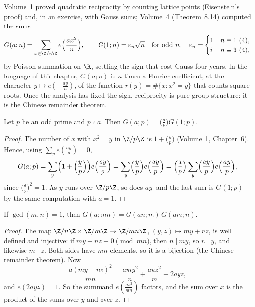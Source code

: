 Volume~1 proved quadratic reciprocity by counting lattice points (Eisenstein's proof) and, in an exercise, with Gauss sums; Volume~4
(Theorem~8.14) computed the sums
\[G(a;n)=\sum_{x\in\Z/n\Z}e\Bigl(\frac{ax^2}n\Bigr),\qquad G(1;n)=\varepsilon_n\sqrt n\quad\text{for odd }n,\quad\varepsilon_n=\begin{cases}1&n\equiv1\ (4),\\i&n\equiv3\ (4),\end{cases}\]
by Poisson summation on $\R$, settling the sign that cost Gauss four years. In the language of this chapter, $G(a;n)$ is $n$ times a
Fourier coefficient, at the character $y\mapsto e(-\frac{ay}n)$, of the function $r(y)=\#\{x:x^2=y\}$ that counts square roots. Once the analysis has fixed
the sign, reciprocity is pure group structure: it is the Chinese remainder theorem.

\begin{lemma}\label{lem:gaussa}
Let $p$ be an odd prime and $p\nmid a$. Then $G(a;p)=\bigl(\frac ap\bigr)G(1;p)$.
\end{lemma}
\begin{proof}
The number of $x$ with $x^2=y$ in $\Z/p\Z$ is $1+\bigl(\frac yp\bigr)$ (Volume~1, Chapter~6). Hence, using $\sum_ye(\frac{ay}p)=0$,
\[G(a;p)=\sum_y\Bigl(1+\Bigl(\frac yp\Bigr)\Bigr)e\Bigl(\frac{ay}p\Bigr)=\sum_y\Bigl(\frac yp\Bigr)e\Bigl(\frac{ay}p\Bigr)=\Bigl(\frac ap\Bigr)\sum_y\Bigl(\frac{ay}p\Bigr)e\Bigl(\frac{ay}p\Bigr),\]
since $\bigl(\frac ap\bigr)^2=1$. As $y$ runs over $\Z/p\Z$, so does $ay$, and the last sum is $G(1;p)$ by the same computation with $a=1$.
\end{proof}

\begin{lemma}\label{lem:gaussmult}
If $\gcd(m,n)=1$, then $G(a;mn)=G(an;m)\,G(am;n)$.
\end{lemma}
\begin{proof}
The map $\Z/n\Z\times\Z/m\Z\to\Z/mn\Z$, $(y,z)\mapsto my+nz$, is well defined and injective: if $my+nz\equiv0\pmod{mn}$, then $n\mid my$, so
$n\mid y$, and likewise $m\mid z$. Both sides have $mn$ elements, so it is a bijection (the Chinese remainder theorem). Now
\[\frac{a(my+nz)^2}{mn}=\frac{amy^2}n+\frac{anz^2}m+2ayz,\]
and $e(2ayz)=1$. So the summand $e(\frac{ax^2}{mn})$ factors, and the sum over $x$ is the product of the sums over $y$ and over $z$.
\end{proof}

